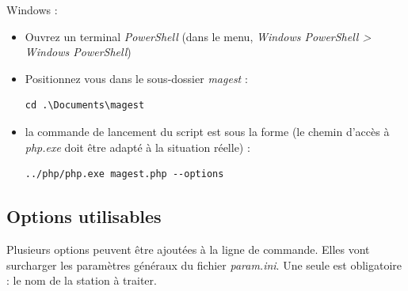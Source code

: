 \documentclass[12pt,a4paper]{article}
\begin{document}
Windows :
\begin{itemize}
\item Ouvrez un terminal \textit{PowerShell} (dans le menu, \textit{Windows PowerShell > Windows PowerShell})
\item Positionnez vous dans le sous-dossier \textit{magest} :
\begin{lstlisting}
cd .\Documents\magest
\end{lstlisting}
\item la commande de lancement du script est sous la forme (le chemin d'accès à \textit{php.exe} doit être adapté à la situation réelle) :
\begin{lstlisting}
../php/php.exe magest.php --options
\end{lstlisting}
\end{itemize}

\subsection{Options utilisables}

Plusieurs options peuvent être ajoutées à la ligne de commande. Elles vont surcharger les paramètres généraux du fichier \textit{param.ini}. Une seule est obligatoire : le nom de la station à traiter.
\end{document}
